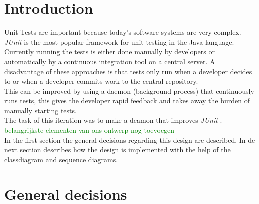 \documentclass[i2]{oss}
\newcommand{\junit}{\emph{JUnit }}
\newcommand{\comment}[1]{{\huge \textcolor{green}{#1}}\\}
\begin{document}

\maketitlepage
\newpage
\tableofcontents
\pagebreak




\section*{Introduction}
\label{ssec:introduction}

Unit Tests are important because today's software systems are very 
complex.
\junit is the most popular framework for unit testing in the Java 
language.
Currently running the tests is either done manually by developers or
automatically by a continuous integration tool on a central server.
A disadvantage of these approaches is that tests only run when a 
developer decides to or when a developer commits work to the central 
repository.\\
This can be improved by using a daemon (background process) that continuously runs tests, this gives the developer rapid feedback and 
takes away the burden of manually starting tests.\\

The task of this iteration was to make a deamon that improves \junit.
\comment{belangrijkste elementen van ons ontwerp nog toevoegen}

In the first section the general decisions regarding this design are described. In de next section describes how the design is implemented with the help of the classdiagram and sequence diagrams.

\section{General decisions}
\label{ssec:general-decisions}
\end{document}
